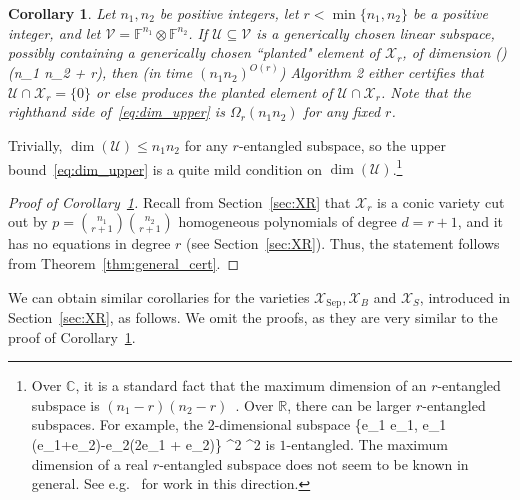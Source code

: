 \documentclass[11pt]{article}
\newtheorem{cor}[theorem]{Corollary}
\theoremstyle{definition}
\newcommand{\setft}[1]{\mathrm{#1}}
\newcommand{\complex}{\mathbb{C}}
\newcommand{\field}{\mathbb{F}}
\newcommand{\real}{\mathbb{R}}
\newcommand\X{\mathcal{X}}
\newcommand\V{\mathcal{V}}
\newcommand\U{\mathcal{U}}
\DeclareMathOperator{\spn}{span}
\newcommand{\anote}[1]{}
\def\ba#1\ea{\begin{align}#1\end{align}}
\begin{document}
\begin{cor}\label{cor:XR}
Let $n_1, n_2$ be positive integers, let $r < \min \{n_1,n_2\}$ be a positive integer, and let ${\V=\field^{n_1}\otimes\field^{n_2}}$. If $\U\subseteq \V$ is a generically chosen linear subspace, possibly containing a generically chosen ``planted" element of $\X_r$, of dimension
\ba\label{eq:dim_upper}
\dim(\U)\leq {} (n_1 n_2 + r),
\ea
then (in time $(n_1 n_2)^{O(r)}$) Algorithm 2 either certifies that $\U\cap \X_r=\{0\}$ or else produces the planted element of $\U \cap \X_r$. Note that the righthand side of~\eqref{eq:dim_upper} is $\Omega_r(n_1n_2)$ for any fixed $r$.
\end{cor}

Trivially, $\dim(\U)\leq n_1 n_2$ for any $r$-entangled subspace, so the upper bound~\eqref{eq:dim_upper} is a quite mild condition on $\dim(\U)$.\footnote{Over $\complex$, it is a standard fact that the maximum dimension of an $r$-entangled subspace is $(n_1-r)(n_2-r)$~\cite{harris2013algebraic,CMW08}. Over $\real$, there can be larger $r$-entangled subspaces. For example, the $2$-dimensional subspace
\ba
\spn\{e_1 \otimes e_1, e_1 \otimes (e_1+e_2)-e_2\otimes (2e_1 + e_2)\} \subseteq \real^2 \otimes \real^2
\ea
is $1$-entangled. The maximum dimension of a real $r$-entangled subspace does not seem to be known in general. See e.g.~\cite{petrovic1996spaces,rees1996linear} for work in this direction.}

\begin{proof}[Proof of Corollary~\ref{cor:XR}]
Recall from Section~\ref{sec:XR} that $\X_r$ is a conic variety cut out by $p=\binom{n_1}{r+1}\binom{n_2}{r+1}$ homogeneous polynomials of degree $d=r+1$, and it has no equations in degree $r$ (see Section~\ref{sec:XR}). Thus, the statement follows from Theorem~\ref{thm:general_cert}.
\end{proof}

We can obtain similar corollaries for the varieties $\X_{\setft{Sep}}, \X_B$ and $\X_S$, introduced in Section~\ref{sec:XR}, as follows. We omit the proofs, as they are very similar to the proof of Corollary~\ref{cor:XR}.

\end{document}
